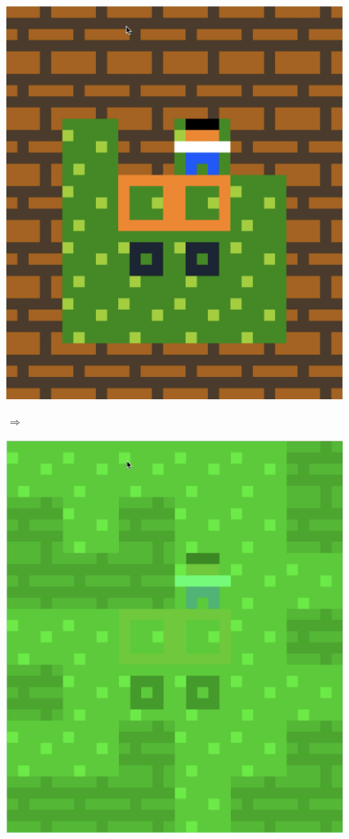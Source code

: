 \begin{figure}[!htbp]
\begin{minipage}[t]{0.2\textwidth}
\includegraphics[width=\textwidth]{figures/maxii3.png} \hfill \\
\end{minipage}
$\Longrightarrow$
\begin{minipage}[t]{0.2\textwidth}
\includegraphics[width=\textwidth]{figures/maxii4_green.png} \hfill \\

\end{minipage}
\end{figure}
